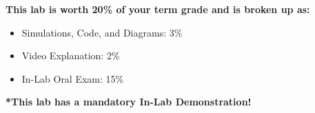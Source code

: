 \vspace{0.5cm}

\textbf{
This lab is worth 20\% of your term grade and is broken up as:
}
\begin{itemize}
    \item Simulations, Code, and Diagrams: 3\%
    \item Video Explanation: 2\%
    \item In-Lab Oral Exam: 15\%
\end{itemize}
\textbf{*This lab has a mandatory In-Lab Demonstration!}